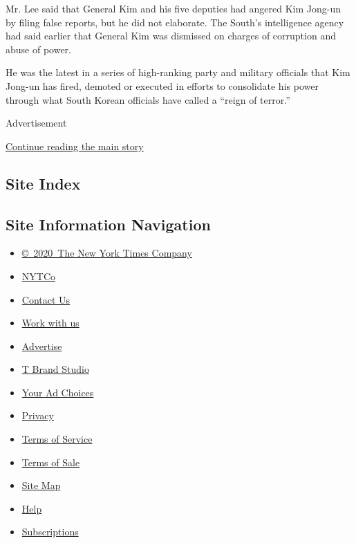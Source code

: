 Mr. Lee said that General Kim and his five deputies had angered Kim
Jong-un by filing false reports, but he did not elaborate. The South's
intelligence agency had said earlier that General Kim was dismissed on
charges of corruption and abuse of power.

He was the latest in a series of high-ranking party and military
officials that Kim Jong-un has fired, demoted or executed in efforts to
consolidate his power through what South Korean officials have called a
``reign of terror.''

Advertisement

\protect\hyperlink{after-bottom}{Continue reading the main story}

\hypertarget{site-index}{%
\subsection{Site Index}\label{site-index}}

\hypertarget{site-information-navigation}{%
\subsection{Site Information
Navigation}\label{site-information-navigation}}

\begin{itemize}
\tightlist
\item
  \href{https://help.nytimes3xbfgragh.onion/hc/en-us/articles/115014792127-Copyright-notice}{©~2020~The
  New York Times Company}
\end{itemize}

\begin{itemize}
\tightlist
\item
  \href{https://www.nytco.com/}{NYTCo}
\item
  \href{https://help.nytimes3xbfgragh.onion/hc/en-us/articles/115015385887-Contact-Us}{Contact
  Us}
\item
  \href{https://www.nytco.com/careers/}{Work with us}
\item
  \href{https://nytmediakit.com/}{Advertise}
\item
  \href{http://www.tbrandstudio.com/}{T Brand Studio}
\item
  \href{https://www.nytimes3xbfgragh.onion/privacy/cookie-policy\#how-do-i-manage-trackers}{Your
  Ad Choices}
\item
  \href{https://www.nytimes3xbfgragh.onion/privacy}{Privacy}
\item
  \href{https://help.nytimes3xbfgragh.onion/hc/en-us/articles/115014893428-Terms-of-service}{Terms
  of Service}
\item
  \href{https://help.nytimes3xbfgragh.onion/hc/en-us/articles/115014893968-Terms-of-sale}{Terms
  of Sale}
\item
  \href{https://spiderbites.nytimes3xbfgragh.onion}{Site Map}
\item
  \href{https://help.nytimes3xbfgragh.onion/hc/en-us}{Help}
\item
  \href{https://www.nytimes3xbfgragh.onion/subscription?campaignId=37WXW}{Subscriptions}
\end{itemize}
